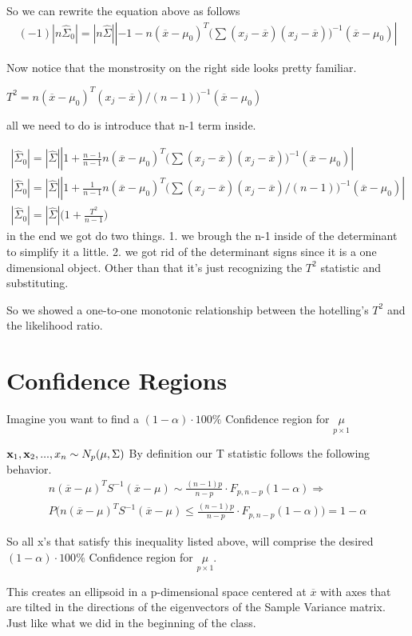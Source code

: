 So we can rewrite the equation above as follows
\begin{gather*}
(-1)|n \hat{\Sigma}_0|= |n \hat{\Sigma}| | -1 -n(\overline{x} -\mu_0)^T \Big( \sum (x_j-\overline{x})(x_j-\overline{x}) \Big)^{-1} (\overline{x} -\mu_0)|
\end{gather*}

Now notice that the monstrosity on the right side looks pretty familiar.

$T^2 = n(\overline{x}-\mu_0)^T(x_j-\overline{x})/(n-1) \Big)^{-1}(\overline{x}-\mu_0)$

all we need to do is introduce that n-1 term inside.

\begin{gather*}
|\hat{\Sigma}_0|= |\hat{\Sigma}| | 1 + \frac{n-1}{n-1}n(\overline{x} -\mu_0)^T \Big( \sum (x_j-\overline{x})(x_j-\overline{x}) \Big)^{-1} (\overline{x} -\mu_0)|\\|\hat{\Sigma}_0|=
| \hat{\Sigma}| | 1 + \frac{1}{n-1}n(\overline{x} -\mu_0)^T \Big( \sum (x_j-\overline{x})(x_j-\overline{x}) /(n-1)\Big)^{-1} (\overline{x} -\mu_0)| \\
|\hat{\Sigma}_0|=
| \hat{\Sigma}|\Big(1 + \frac{T^2}{n-1})
\end{gather*}
in the end we got do two things. 1. we brough the n-1 inside of the determinant to simplify it a little. 2. we got rid of the determinant signs since it is a one dimensional object. Other than that it's just recognizing the $T^2$ statistic and substituting.

So we showed a one-to-one monotonic relationship between the hotelling's $T^2$ and the likelihood ratio.

\section{Confidence Regions}
Imagine you want to find a $(1-\alpha)\cdot 100\%$ Confidence region for $\underset{p\times 1}{\mu}$

$\mathbf{x}_1,\mathbf{x}_2,..., x_n \sim N_p(\mu,\Sigma)$
By definition our T statistic follows the following behavior.
\begin{gather*}
    n(\overline{x}-\mu)^TS^{-1}(\overline{x}-\mu) \sim \frac{(n-1)p}{n-p}\cdot F_{p,n-p}(1-\alpha) \Rightarrow\\
    P \Bigg(n(\overline{x}-\mu)^TS^{-1}(\overline{x}-\mu) \leq \frac{(n-1)p}{n-p}\cdot F_{p,n-p}(1-\alpha)\Bigg) = 1-\alpha
\end{gather*}

So all x's that satisfy this inequality listed above, will comprise the desired $(1-\alpha)\cdot 100\%$ Confidence region for $\underset{p\times 1}{\mu}$.

This creates an ellipsoid in a p-dimensional space centered at $\overline{x}$ with axes that are tilted in the directions of the eigenvectors of the Sample Variance matrix. Just like what we did in the beginning of the class.